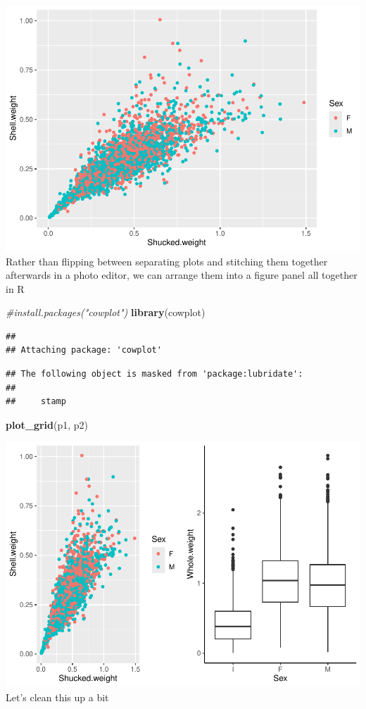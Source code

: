 \documentclass[
]{book}
\newenvironment{Shaded}{\begin{snugshade}}{\end{snugshade}}
\newcommand{\CommentTok}[1]{\textcolor[rgb]{0.56,0.35,0.01}{\textit{#1}}}
\newcommand{\FunctionTok}[1]{\textcolor[rgb]{0.13,0.29,0.53}{\textbf{#1}}}
\newcommand{\NormalTok}[1]{#1}
\begin{document}
\includegraphics{_main_files/figure-latex/unnamed-chunk-52-1.pdf}
Rather than flipping between separating plots and stitching them together afterwards in a photo editor, we can arrange them into a figure panel all together in R

\begin{Shaded}
\begin{Highlighting}[]
\CommentTok{\#install.packages("cowplot")}
\FunctionTok{library}\NormalTok{(cowplot)}
\end{Highlighting}
\end{Shaded}

\begin{verbatim}
## 
## Attaching package: 'cowplot'
\end{verbatim}

\begin{verbatim}
## The following object is masked from 'package:lubridate':
## 
##     stamp
\end{verbatim}

\begin{Shaded}
\begin{Highlighting}[]
\FunctionTok{plot\_grid}\NormalTok{(p1, p2)}
\end{Highlighting}
\end{Shaded}

\includegraphics{_main_files/figure-latex/unnamed-chunk-53-1.pdf}
Let's clean this up a bit
\end{document}
